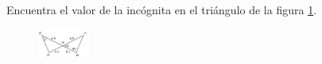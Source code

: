 \question[10]  Encuentra el valor de la incógnita en el triángulo de la figura \ref{fig:angle_triangle_29}.
\begin{figure}[H]
    \begin{center}
        \includegraphics[width=0.15\textwidth]{../images/angle_triangle_29.png}
    \end{center}
    \caption{}
    \label{fig:angle_triangle_29}
\end{figure}